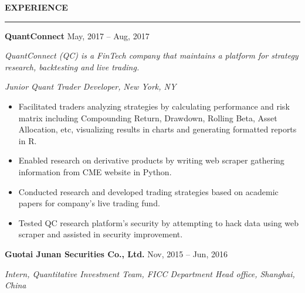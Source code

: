 \documentclass[a4paper,12pt]{report}
\newcommand{\marginAdj}{0.5in}
\begin{document}
 
\noindent 
\textbf{EXPERIENCE} \par
\vspace{2pt}
\hrule
\vspace{6pt}
\noindent 
\textbf{QuantConnect}{\fontsize{9pt}{9pt}\selectfont  \hspace*{4.35in} \hspace*{\marginAdj}  {\fontsize{10pt}{10pt}\selectfont May, 2017 – Aug, 2017}} \par
\noindent 
{\fontsize{10pt}{10pt}\selectfont \textit{QuantConnect (QC) is a FinTech company that maintains a platform for strategy research, backtesting and live trading.}} \par
\noindent 
{\fontsize{10pt}{10pt}\selectfont \textit{Junior Quant Trader Developer}\textit{, }\textit{New York}\textit{, NY}} \par
\noindent 
\begin{itemize}[noitemsep,topsep=0pt]
\item {\fontsize{10pt}{10pt}\selectfont Facilitated traders analyzing strategies by calculating performance and risk matrix including Compounding Return, Drawdown, Rolling Beta, Asset Allocation, etc, visualizing results in charts and generating formatted reports in R.} \par
\noindent 
\item {\fontsize{10pt}{10pt}\selectfont Enabled research on derivative products by writing web scraper gathering information from CME website in Python. } \par
\noindent 
\item {\fontsize{10pt}{10pt}\selectfont Conducted research and developed trading strategies based on academic papers for company’s live trading fund.} \par
\item {\fontsize{10pt}{10pt}\selectfont Tested QC research platform's security by attempting to hack data using web scraper and assisted in security improvement.} \par
\noindent 
\end{itemize}
\noindent 
\textbf{Guotai Junan Securities Co., Ltd.}{\fontsize{9pt}{9pt}\selectfont  \hspace*{3.15in}  \hspace*{\marginAdj} {\fontsize{10pt}{10pt}\selectfont Nov, 2015 – Jun, 2016}} \par
\noindent 
{\fontsize{10pt}{10pt}\selectfont \textit{Intern, Quantitative Investment Team, FICC Department Head office, Shanghai, China}} \par
\end{document}
